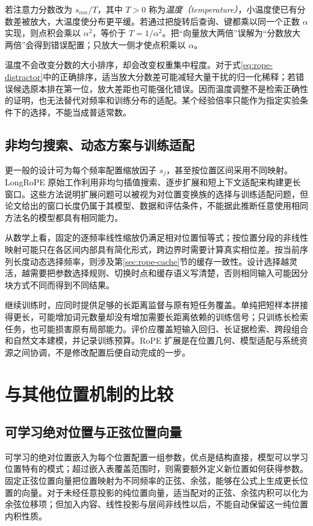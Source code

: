 \documentclass[UTF8,12pt,a4paper,fontset=fandol]{ctexart}
\begin{document}
若注意力分数改为 $s_{mn}/T$，其中 $T>0$ 称为\emph{温度（temperature）}，小温度使已有分数差被放大，大温度使分布更平缓。若通过把旋转后查询、键都乘以同一个正数 $\alpha$ 实现，则点积会乘以 $\alpha^2$，等价于 $T=1/\alpha^2$。把“向量放大两倍”误解为“分数放大两倍”会得到错误配置；只放大一侧才使点积乘以 $\alpha$。

温度不会改变分数的大小排序，却会改变权重集中程度。对于式\eqref{eq:rope-distractor}中的正确排序，适当放大分数差可能减轻大量干扰的归一化稀释；若错误候选原本排在第一位，放大差距也可能强化错误。因而温度调整不是检索正确性的证明，也无法替代对频率和训练分布的适配。某个经验倍率只能作为指定实验条件下的选择，不能当成普适常数。

\subsection{非均匀搜索、动态方案与训练适配}
更一般的设计可为每个频率配置缩放因子 $s_j$，甚至按位置区间采用不同映射。LongRoPE 原始工作利用非均匀插值搜索、逐步扩展和短上下文适配来构建更长窗口\cite{ding2024}。这些方法说明扩展问题可以被视为对位置变换族的选择与训练适配问题，但论文给出的窗口长度仍属于其模型、数据和评估条件，不能据此推断任意使用相同方法名的模型都具有相同能力。

从数学上看，固定的逐频率线性缩放仍满足相对位置恒等式；按位置分段的非线性映射可能只在各区间内部具有简化形式，跨边界时需要计算真实相位差。按当前序列长度动态选择频率，则涉及第\ref{sec:rope-cache}节的缓存一致性。设计选择越灵活，越需要把参数选择规则、切换时点和缓存语义写清楚，否则相同输入可能因分块方式不同而得到不同结果。

继续训练时，应同时提供足够的长距离监督与原有短任务覆盖。单纯把短样本拼接得更长，可能增加词元数量却没有增加需要长距离依赖的训练信号；只训练长检索任务，也可能损害原有局部能力。评价应覆盖短输入回归、长证据检索、跨段组合和自然文本建模，并记录训练预算。RoPE 扩展是在位置几何、模型适配与系统资源之间协调，不是修改配置后便自动完成的一步。

\section{与其他位置机制的比较}
\label{sec:rope-comparison}

\subsection{可学习绝对位置与正弦位置向量}
可学习的绝对位置嵌入为每个位置配置一组参数，优点是结构直接，模型可以学习位置特有的模式；超过嵌入表覆盖范围时，则需要额外定义新位置如何获得参数。固定正弦位置向量把位置映射为不同频率的正弦、余弦，能够在公式上生成更长位置的向量。对于未经任意投影的纯位置向量，适当配对的正弦、余弦内积可以化为余弦位移项；但加入内容、线性投影与层间非线性以后，不能自动保留这一纯位置内积性质。
\end{document}

